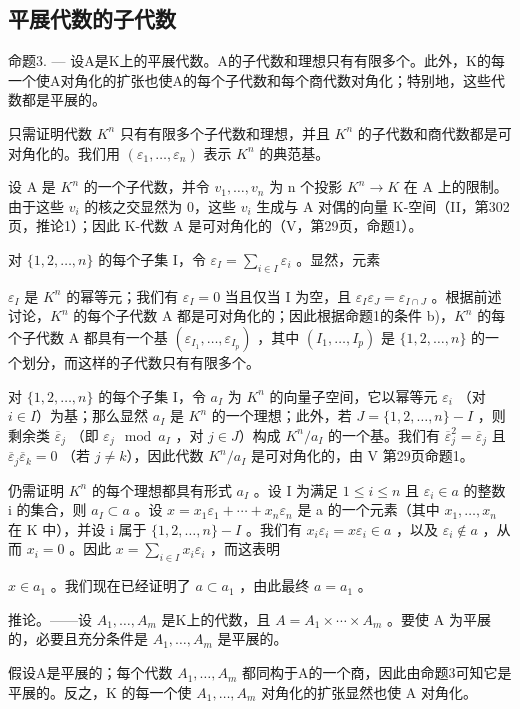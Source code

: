\subsection{平展代数的子代数}

命题3. --- 设A是K上的平展代数。A的子代数和理想只有有限多个。此外，K的每一个使A对角化的扩张也使A的每个子代数和每个商代数对角化；特别地，这些代数都是平展的。

只需证明代数 \(K^{n}\) 只有有限多个子代数和理想，并且 \(K^{n}\) 的子代数和商代数都是可对角化的。我们用 \((\varepsilon_{1},\ldots,\varepsilon_{n})\) 表示 \(K^{n}\) 的典范基。

设 A 是 \(K^{n}\) 的一个子代数，并令 \(v_{1}, \ldots, v_{n}\) 为 n 个投影 \(K^{n} \rightarrow K\) 在 A 上的限制。由于这些 \(v_{i}\) 的核之交显然为 0，这些 \(v_{i}\) 生成与 A 对偶的向量 K-空间（II，第302页，推论1）；因此 K-代数 A 是可对角化的（V，第29页，命题1）。

对 \(\{1, 2, \ldots, n\}\) 的每个子集 I，令 \(\varepsilon_{I} = \sum_{i \in I} \varepsilon_{i}\) 。显然，元素

\(\varepsilon_{I}\) 是 \(K^{n}\) 的幂等元；我们有 \(\varepsilon_{I}=0\) 当且仅当 I 为空，且 \(\varepsilon_{I}\varepsilon_{J}=\varepsilon_{I\cap J}\) 。根据前述讨论，\(K^{n}\) 的每个子代数 A 都是可对角化的；因此根据命题1的条件 b)，\(K^{n}\) 的每个子代数 A 都具有一个基 \((\varepsilon_{I_{1}},\ldots,\varepsilon_{I_{p}})\) ，其中 \((I_{1},\ldots,I_{p})\) 是 \(\{1,2,\ldots,n\}\) 的一个划分，而这样的子代数只有有限多个。

对 \(\{1,2,\ldots,n\}\) 的每个子集 I，令 \(a_{I}\) 为 \(K^{n}\) 的向量子空间，它以幂等元 \(\varepsilon_{i}\) （对 \(i\in I\)）为基；那么显然 \(a_{I}\) 是 \(K^{n}\) 的一个理想；此外，若 \(J=\{1,2,\ldots,n\}-I\) ，则剩余类 \(\overline{\varepsilon}_{j}\) （即 \(\varepsilon_{j} \mod a_{I}\) ，对 \(j\in J\)）构成 \(K^{n}/a_{I}\) 的一个基。我们有 \(\overline{\varepsilon}_{j}^{2}=\overline{\varepsilon}_{j}\) 且 \(\overline{\varepsilon}_{j}\overline{\varepsilon}_{k}=0\) （若 \(j\neq k\)），因此代数 \(K^{n}/a_{I}\) 是可对角化的，由 V 第29页命题1。

仍需证明 \(K^{n}\) 的每个理想都具有形式 \(a_{I}\) 。设 I 为满足 \(1 \leqslant i \leqslant n\) 且 \(\varepsilon_{i} \in a\) 的整数 i 的集合，则 \(a_{I} \subset a\) 。设 \(x = x_{1}\varepsilon_{1} + \cdots + x_{n}\varepsilon_{n}\) 是 a 的一个元素（其中 \(x_{1}, \ldots, x_{n}\) 在 K 中），并设 i 属于 \(\{1, 2, \ldots, n\} - I\) 。我们有 \(x_{i}\varepsilon_{i} = x\varepsilon_{i} \in a\) ，以及 \(\varepsilon_{i} \notin a\) ，从而 \(x_{i} = 0\) 。因此 \(x = \sum_{i \in I} x_{i}\varepsilon_{i}\) ，而这表明

\(x \in a_{1}\) 。我们现在已经证明了 \(a \subset a_{1}\) ，由此最终 \(a = a_{1}\) 。

推论。——设 \(A_{1}, \ldots, A_{m}\) 是K上的代数，且 \(A = A_{1} \times \cdots \times A_{m}\) 。要使 A 为平展的，必要且充分条件是 \(A_{1}, \ldots, A_{m}\) 是平展的。

假设A是平展的；每个代数 \(A_{1}, \ldots, A_{m}\) 都同构于A的一个商，因此由命题3可知它是平展的。反之，K 的每一个使 \(A_{1}, \ldots, A_{m}\) 对角化的扩张显然也使 A 对角化。

